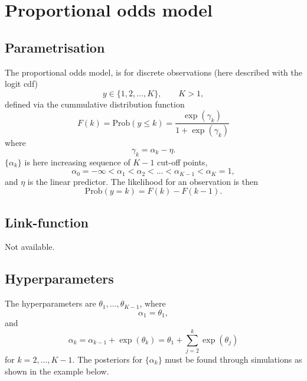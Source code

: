 \documentclass[a4paper,11pt]{article}
\begin{document}
\section*{Proportional odds model}

\subsection*{Parametrisation}

The proportional odds model, is for discrete observations (here
described with the logit cdf)
\begin{displaymath}
    y \in \{ 1, 2, \ldots, K\}, \qquad K>1,
\end{displaymath}
defined via the cummulative distribution function
\begin{displaymath}
    F(k) = \text{Prob}(y \le k)  = \frac{\exp(\gamma_k)}{1 + \exp(\gamma_k)}
\end{displaymath}
where
\begin{displaymath}
    \gamma_k = \alpha_k - \eta.
\end{displaymath}
$\{\alpha_k\}$ is here increasing sequence of $K-1$ cut-off points, 
\begin{displaymath}
    \alpha_{0} = -\infty < \alpha_1 < \alpha_2 < \ldots < \alpha_{K-1}
    < \alpha_K=1,
\end{displaymath}
and $\eta$ is the linear predictor. The likelihood for an observation
is then
\begin{displaymath}
    \text{Prob}(y = k) = F(k) - F(k-1).
\end{displaymath}

\subsection*{Link-function}

Not available.

\subsection*{Hyperparameters}

The hyperparameters are $\theta_1, \ldots, \theta_{K-1}$, where
\begin{displaymath}
    \alpha_1 = \theta_1,
\end{displaymath}
and 
\begin{displaymath}
    \alpha_{k} = \alpha_{k-1} + \exp(\theta_{k}) = \theta_1 +
    \sum_{j=2}^{k} \exp(\theta_j)
\end{displaymath}
for $k=2, \ldots, K-1$. The posteriors for $\{\alpha_k\}$ must be
found through simulations as shown in the example below.
\end{document}
